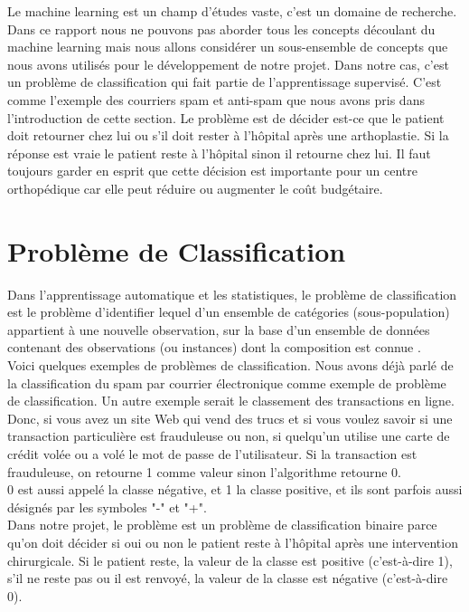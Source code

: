 \documentclass[12pt, french]{report}
\begin{document}
Le machine learning est un champ d'études vaste, c'est un domaine de recherche. Dans ce rapport nous ne pouvons pas aborder tous les concepts découlant du machine learning mais nous allons considérer un sous-ensemble de concepts que nous avons utilisés pour le développement de notre projet. Dans notre cas, c'est un problème de classification qui fait partie de l'apprentissage supervisé. C'est comme l'exemple des courriers spam et anti-spam que nous avons pris dans l'introduction de cette section. Le problème est de décider est-ce que le patient doit retourner chez lui ou s'il doit rester à l'hôpital après une arthoplastie. Si la réponse est vraie le patient reste à l'hôpital sinon il retourne chez lui. Il faut toujours garder en esprit que cette décision est importante pour un centre orthopédique car elle peut réduire ou augmenter le coût budgétaire.   

\section{Problème de Classification}

Dans l'apprentissage automatique et les statistiques, le problème de classification est le problème d'identifier lequel d'un ensemble de catégories (sous-population) appartient à une nouvelle observation, sur la base d'un ensemble de données contenant des observations (ou instances) dont la composition est connue \cite{key16}.\\

Voici quelques exemples de problèmes de classification. Nous avons déjà parlé de la classification du spam par courrier électronique comme exemple de problème de classification. Un autre exemple serait le classement des transactions en ligne. Donc, si vous avez un site Web qui vend des trucs et si vous voulez savoir si une transaction particulière est frauduleuse ou non, si quelqu'un utilise une carte de crédit volée ou a volé le mot de passe de l'utilisateur. Si la transaction est frauduleuse, on retourne 1 comme valeur sinon l'algorithme retourne 0.\\
0 est aussi appelé la classe négative, et 1 la classe positive, et ils sont parfois aussi désignés par les symboles "-" et "+".\\

Dans notre projet, le problème est un problème de classification binaire parce qu'on doit décider si oui ou non le patient reste à l'hôpital après une intervention chirurgicale. Si le patient reste, la valeur de la classe est positive (c'est-à-dire 1), s'il ne reste pas ou il est renvoyé, la valeur de la classe est négative (c'est-à-dire 0).
\end{document}
